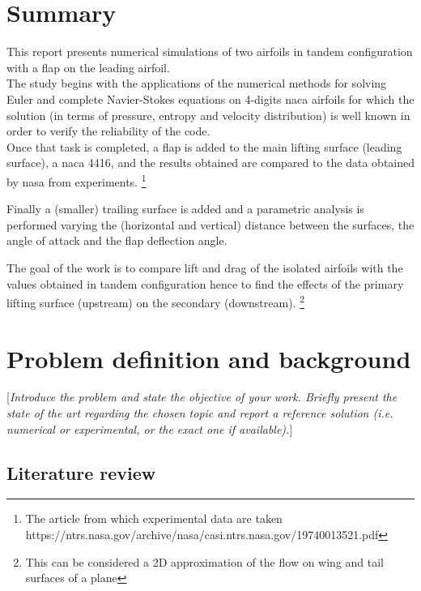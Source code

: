 \documentclass[11pt,english, openany]{book}
\begin{document}
\tableofcontents{}

\mainmatter

\chapter{Summary}\label{chapt:sum}

This report presents numerical simulations of two airfoils in tandem configuration with a flap on the leading airfoil. \\
The study begins with the applications of the numerical methods for solving Euler and complete Navier-Stokes equations on 4-digits naca airfoils for which the solution (in terms of pressure, entropy and velocity distribution) is well known in order to verify the reliability of the code.\\
Once that task is completed, a flap is added to the main lifting surface (leading surface), a naca 4416, and the results obtained are compared to the data obtained by nasa from experiments. \footnote{The article from which experimental data are taken https://ntrs.nasa.gov/archive/nasa/casi.ntrs.nasa.gov/19740013521.pdf}

Finally a (smaller) trailing surface is added and a parametric analysis is performed varying the (horizontal and vertical) distance between the surfaces, the angle of attack and the flap deflection angle.

The goal of the work is to compare lift and drag of the isolated airfoils with the values obtained in tandem configuration hence to find the effects of the primary lifting surface (upstream) on the secondary (downstream). \footnote{This can be considered a 2D approximation of the flow on wing and tail surfaces of a plane}

\chapter{Problem definition and background}
[\textit{Introduce the problem and state the objective of your work. Briefly present the state of the art regarding the chosen topic and report a reference solution (i.e. numerical or experimental, or the exact one if available).}]
\section{Literature review}
\end{document}
